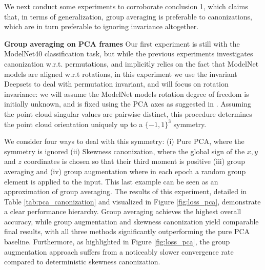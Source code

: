 \documentclass{article}
\theoremstyle{definition}
\theoremstyle{plain}
\begin{document}

We next conduct some experiments to corroborate conclusion 1, which claims that, in terms of generalization, group averaging is preferable to canonizations, which are in turn preferable to ignoring invariance altogether.

\textbf{Group averaging on PCA frames} Our first experiment is still with the ModelNet40 classification task, but while the previous experiments investigates canonization w.r.t. permutations, and implicitly relies on the fact that ModelNet models are aligned w.r.t rotations, in this experiment we use the invariant Deepsets \cite{zaheer2017deep} to deal with permutation invariant, and will focus on rotation invariance: we will assume the ModelNet models rotation degree of freedom is initially unknown, and is fixed using the PCA axes as suggested in \cite{punyframe}. Assuming the point cloud singular values are pairwise distinct, this procedure determines the point cloud orientation uniquely up to a $\{-1,1\}^3$ symmetry.

We consider four ways to deal with this symmetry: (i) Pure PCA, where the symmetry is ignored (ii) Skewness canonization, where the global sign of the $x,y$ and $z$ coordinates is chosen so that their third moment is positive (iii) group averaging and (iv) group augmentation where in each epoch a random group element is applied to the input. This last example can be seen as an approximation of group averaging. The results of this experiment, detailed in Table \ref{tab:pca_canonization} and visualized in Figure \ref{fig:loss_pca}, demonstrate a clear performance hierarchy. Group averaging achieves the highest overall accuracy, while group augmentation and skewness canonization yield comparable final results, with all three methods significantly outperforming the pure PCA baseline. Furthermore, as highlighted in Figure \ref{fig:loss_pca}, the group augmentation approach suffers from a noticeably slower convergence rate compared to deterministic skewness canonization. 
\end{document}
